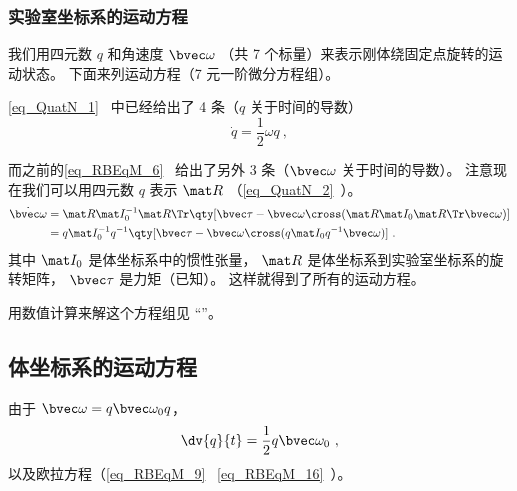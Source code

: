 
\begin{issues}
\issueAbstract
\end{issues}


\subsubsection{实验室坐标系的运动方程}
我们用四元数 $q$ 和角速度 $\bvec \omega$ （共 7 个标量）来表示刚体绕固定点旋转的运动状态。 下面来列运动方程（7 元一阶微分方程组）。

\autoref{eq_QuatN_1}~ 中已经给出了 4 条（$q$ 关于时间的导数）
\begin{equation}
\dot{q} = \frac12 \omega q~,
\end{equation}

而之前的\autoref{eq_RBEqM_6}~ 给出了另外 3 条（$\bvec\omega$ 关于时间的导数）。 注意现在我们可以用四元数 $q$ 表示 $\mat R$ （\autoref{eq_QuatN_2}~）。
\begin{equation}
\begin{aligned}
\dot{\bvec \omega} &= \mat R \mat I_0^{-1} \mat R\Tr \qty[\bvec \tau  - \bvec\omega\cross(\mat R \mat I_0 \mat R\Tr \bvec\omega)]\\
&= q \mat I_0^{-1} q^{-1} \qty[\bvec \tau  - \bvec\omega\cross(q \mat I_0 q^{-1}\bvec\omega)]~.
\end{aligned}
\end{equation}
其中 $\mat I_0$ 是体坐标系中的惯性张量， $\mat R$ 是体坐标系到实验室坐标系的旋转矩阵， $\bvec\tau$ 是力矩（已知）。 这样就得到了所有的运动方程。

用数值计算来解这个方程组见 “”。

\subsection{体坐标系的运动方程}
由于 $\bvec\omega = q\bvec\omega_0 q$，
\begin{equation}
\dv{q}{t} = \frac12 q \bvec \omega_0~,
\end{equation}
以及欧拉方程（\autoref{eq_RBEqM_9}~ \autoref{eq_RBEqM_16}~）。
